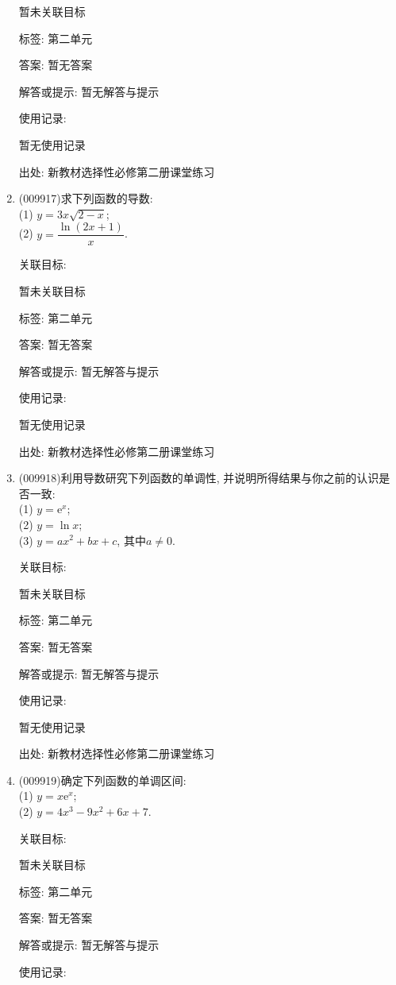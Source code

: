 \documentclass[10pt,a4paper]{article}
\begin{document}
\begin{enumerate}[1.]
暂未关联目标



标签: 第二单元

答案: 暂无答案

解答或提示: 暂无解答与提示

使用记录:

暂无使用记录


出处: 新教材选择性必修第二册课堂练习
\item { (009917)}求下列函数的导数:\\
(1) $y=3x \sqrt{2-x}$;\\
(2) $y=\dfrac{\ln(2x+1)}x$.


关联目标:

暂未关联目标



标签: 第二单元

答案: 暂无答案

解答或提示: 暂无解答与提示

使用记录:

暂无使用记录


出处: 新教材选择性必修第二册课堂练习
\item { (009918)}利用导数研究下列函数的单调性, 并说明所得结果与你之前的认识是否一致:\\
(1) $y=\mathrm{e}^x$;\\
(2) $y=\ln x$;\\
(3) $y=ax^2+bx+c$, 其中$a\ne 0$.


关联目标:

暂未关联目标



标签: 第二单元

答案: 暂无答案

解答或提示: 暂无解答与提示

使用记录:

暂无使用记录


出处: 新教材选择性必修第二册课堂练习
\item { (009919)}确定下列函数的单调区间:\\
(1) $y=x\mathrm{e}^x$;\\
(2) $y=4x^3-9x^2+6x+7$.


关联目标:

暂未关联目标



标签: 第二单元

答案: 暂无答案

解答或提示: 暂无解答与提示

使用记录:


\end{enumerate}
\end{document}

